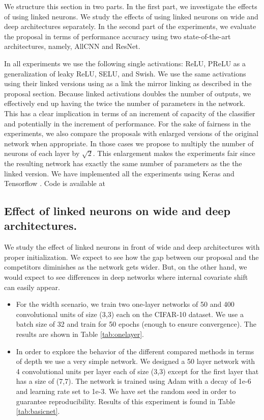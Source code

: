 \documentclass[10pt,twocolumn,letterpaper]{article}
\begin{document}
We structure this section in two parts. In the first part, we investigate the effects of using linked neurons. We  study the effects of using linked neurons on wide and deep architectures separately. In the second part of the experiments, we evaluate the proposal in terms of performance accuracy using two state-of-the-art architectures, namely, AllCNN\cite{allcnn} and ResNet\cite{resnet}.

In all experiments we use the following single activations: ReLU, PReLU as a generalization of leaky ReLU, SELU, and Swish. We use the same activations using their linked versions using as a link the mirror linking as described in the proposal section. Because linked activations doubles the number of outputs, we effectively end up having the twice the number of parameters in the network. This has a clear implication in terms of an increment of capacity of the classifier and potentially in the increment of performance. For the sake of fairness in the experiments, we also compare the proposals with enlarged versions of the original network when appropriate. In those cases we propose to multiply the number of neurons of each layer by $\sqrt{2}$. This enlargement makes the experiments fair since the resulting network has exactly the same number of parameters as the the linked version. We have implemented all the experiments using Keras \cite{chollet2015keras} and Tensorflow \cite{tensorflow2015-whitepaper}. Code is available at \cite{code}

\subsection{Effect of linked neurons on wide and deep architectures.}

We study the effect of linked neurons in front of wide and deep architectures with proper initialization. We expect to see how the gap between our proposal and the competitors diminishes as the network gets wider. But, on the other hand, we would expect to see differences in deep networks where internal covariate shift can easily appear. 

\begin{itemize}
    \item For the width scenario, we train two one-layer networks of 50 and 400 convolutional units of size (3,3) each on the CIFAR-10 dataset. We use a batch size of 32 and train for 50 epochs (enough to ensure convergence). The results are shown in Table \ref{tab:onelayer}. 
    \item In order to explore the behavior of the different compared methods in terms of depth we use a very simple network. We designed a 50 layer network with 4 convolutional units per layer each of size (3,3) except for the first layer that has a size of (7,7). The network is trained using Adam \cite{adam} with a decay of 1e-6 and learning rate set to 1e-3. We have set the random seed in order to guarantee reproducibility. Results of this experiment is found in Table \ref{tab:basicnet}.
\end{itemize}
\end{document}
